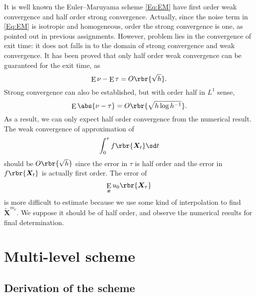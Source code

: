 \documentclass[english, nochinese]{pnote}
\DeclareMathOperator\ope{\mathrm{E}}
\begin{document}
It is well known the Euler--Maruyama scheme \eqref{Eq:EM} have first order weak convergence and half order strong convergence. Actually, since the noise term in \eqref{Eq:EM} is isotropic and homogeneous, order the strong convergence is one, as pointed out in previous assignments. However, problem lies in the convergence of exit time: it does not falls in to the domain of strong convergence and weak convergence. It has been proved \parencite{higham_mean_2013} that only half order weak convergence can be guaranteed for the exit time, as
\begin{equation}
\ope \nu - \ope \tau = O \rbr{\sqrt{h}}.
\end{equation}
Strong convergence can also be established, but with order half in $L^1$ sense,
\begin{equation}
\ope \abs{ \nu - \tau } = O \rbr{\sqrt{ h \log h^{-1} }}.
\end{equation}
As a result, we can only expect half order convergence from the numerical result. The weak convergence of approximation of
\begin{equation}
\int_0^{\tau} f \rbr{\bm{X}_t} \sd t
\end{equation}
should be $ O \rbr{\sqrt{h}} $ since the error in $\tau$ is half order and the error in $ f \rbr{\bm{X}_t} $ is actually first order. The error of
\begin{equation}
\ope_{\bm{x}} u_0 \rbr{\bm{X}_{\tau}}
\end{equation}
is more difficult to estimate because we use some kind of interpolation to find $\tilde{\bm{X}}^{m_{\nu}}$. We suppose it should be of half order, and observe the numerical results for final determination.

\section{Multi-level scheme}

\subsection{Derivation of the scheme}
\end{document}
